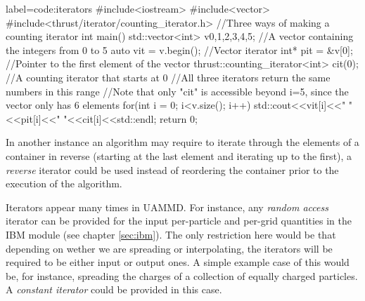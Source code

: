 \documentclass[ twoside,openright,titlepage,numbers=noenddot,%
headinclude,footinclude,cleardoublepage=empty,abstract=on,
BCOR=5mm,paper=a4,fontsize=11pt, dvipsnames
]{scrreprt}
\newcommand{\uammd}{\gls{UAMMD}\xspace}
\begin{document}
\begin{code2} {label=code:iterators}
#include<iostream>
#include<vector>
#include<thrust/iterator/counting_iterator.h>
//Three ways of making a counting iterator
int main(){
  std::vector<int> v{0,1,2,3,4,5}; //A vector containing the integers from 0 to 5
  auto vit = v.begin(); //Vector iterator
  int* pit = &v[0];     //Pointer to the first element of the vector
  thrust::counting_iterator<int> cit(0); //A counting iterator that starts at 0
  //All three iterators return the same numbers in this range
  //Note that only "cit" is accessible beyond i=5, since the vector only has 6 elements
  for(int i = 0; i<v.size(); i++){
    std::cout<<vit[i]<<" "<<pit[i]<<" "<<cit[i]<<std::endl;
  }
  return 0;
}
\end{code2}
In another instance an algorithm may require to iterate through the elements of a container in reverse (starting at the last element and iterating up to the first), a \emph{reverse} iterator could be used instead of reordering the container prior to the execution of the algorithm.

Iterators appear many times in \uammd. For instance, any \emph{random access} iterator can be provided for the input per-particle and per-grid quantities in the \gls{IBM} module (see chapter \ref{sec:ibm}). The only restriction here would be that depending on wether we are spreading or interpolating, the iterators will be required to be either input or output ones. A simple example case of this would be, for instance, spreading the charges of a collection of equally charged particles. A \emph{constant iterator} could be provided in this case.
\end{document}
